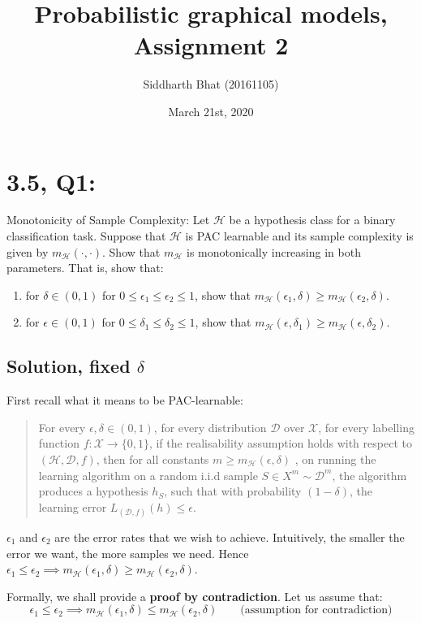 \documentclass[11pt]{article}
\title{Probabilistic graphical models, Assignment 2}
\author{Siddharth Bhat (20161105)}
\date{March 21st, 2020}
\newcommand{\D}{\ensuremath{\mathcal{D}}}
\renewcommand{\H}{\ensuremath{\mathcal{H}}}
\newcommand{\X}{\ensuremath{\mathcal{X}}}
\begin{document}
\maketitle
\section*{3.5, Q1:}
Monotonicity of Sample Complexity: Let $\H$ be a hypothesis class for a
binary classification task. Suppose that $\H$ is PAC learnable and its sample
complexity is given by $m_\H (\cdot, \cdot)$. Show that $m_\H$ is monotonically
increasing in both parameters. That is, show that:
\begin{enumerate}
    \item for $\delta \in (0, 1)$ for $0 \leq \epsilon_1 \leq \epsilon_2 \leq 1$,
        show that $m_\H(\epsilon_1, \delta) \geq m_\H(\epsilon_2, \delta)$.
    \item  for $\epsilon \in (0, 1)$ for $0 \leq \delta_1 \leq \delta_2 \leq 1$,
        show that $m_\H(\epsilon, \delta_1) \geq m_\H(\epsilon, \delta_2)$.
\end{enumerate}
\subsection*{Solution, fixed $\delta$}
First recall what it means to be PAC-learnable:

\begin{quote}
For every $\epsilon, \delta \in (0, 1)$, for every distribution $\D$ over $\X$,
for every labelling function $f: \X \rightarrow \{0, 1\}$, if the realisability
assumption holds with respect to $(\H, \D, f)$, then for all constants
$m \geq m_\H(\epsilon, \delta)$ , on running the learning algorithm on
a random i.i.d sample $S \in X^m \sim \D^m$, the algorithm produces a hypothesis
$h_S$, such that with probability $(1 - \delta)$, the learning error 
$L_{(\D, f)}(h) \leq \epsilon$.
\end{quote}

$\epsilon_1$ and $\epsilon_2$ are the error rates that we wish to achieve.
Intuitively, the smaller the error we want, the more samples we need. 
Hence $\epsilon_1 \leq \epsilon_2 \implies m_\H(\epsilon_1, \delta) \geq m_\H(\epsilon_2, \delta)$.

Formally, we shall provide a \textbf{proof by contradiction}. Let us
assume that:
$$
\epsilon_1 \leq \epsilon_2 \implies m_\H(\epsilon_1, \delta) \leq m_\H(\epsilon_2, \delta) \qquad 
\text{(assumption for contradiction)}
$$
\end{document}
